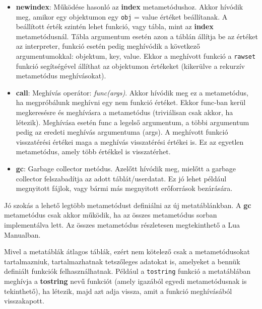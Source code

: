\begin{itemize}
	\item \detokenize{__}\textbf{newindex}: Működése hasonló az \detokenize{__}\textbf{index} metametódushoz. Akkor hívódik meg, amikor egy objektumon egy \texttt{obj}\detokenize{[key]} = value értéket beállítanak. A beállított érték szintén lehet funkció, vagy tábla, mint az \detokenize{__}\textbf{index} metametódusnál. Tábla argumentum esetén azon a táblán állítja be az értéket az interpreter, funkció esetén pedig meghívódik a következő argumentumokkal: objektum, key, value. Ekkor a meghívott funkció a \texttt{rawset} funkció segítségével állíthat az objektumon értékeket (kikerülve a rekurzív metametódus meghívásokat).
	\item \detokenize{__}\textbf{call}: Meghívás operátor: \emph{func(args)}. Akkor hívódik meg ez a metametódus, ha megpróbálunk meghívni egy nem funkció értéket. Ekkor func-ban kerül megkeresésre és meghívásra a metametódus (triviálisan csak akkor, ha létezik). Meghívása esetén func a legelső argumentum, a többi argumentum pedig az eredeti meghívás argumentuma (args). A meghívott funkció visszatérési értékei maga a meghívás visszatérési értékei is. Ez az egyetlen metametódus, amely több értékkel is visszatérhet.
	\item \detokenize{__}\textbf{gc}: Garbage collector metódus. Azelőtt hívódik meg, mielőtt a garbage collector felszabadítja az adott táblát/userdatat. Ez jó lehet például megnyitott fájlok, vagy bármi más megnyitott erőforrások bezárására.
\end{itemize}

Jó szokás a lehető legtöbb metametódust definiálni az új metatáblánkban. A \detokenize{__}\textbf{gc} metametódus csak akkor működik, ha az összes metametódus sorban implementálva lett. Az összes metametódus részletesen megtekinthető a Lua Manualban.

Mivel a metatáblák átlagos táblák, ezért nem kötelező csak a metametódusokat tartalmazniuk, tartalmazhatnak tetszőleges adatokat is, amelyeket a bennük definiált funkciók felhasználhatnak. Például a \texttt{tostring} funkció a metatáblában meghívja a \detokenize{__}\textbf{tostring} nevű funkciót (amely igazából egyedi metametódusnak is tekinthető), ha létezik, majd azt adja vissza, amit a funkció meghívásából visszakapott. \cite{metatable1}

\pagebreak


